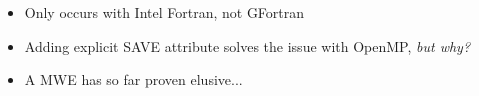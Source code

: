 \documentclass{beamer}
\begin{document}
\begin{frame}
{\begin{itemize}
      \item Only occurs with Intel Fortran, not GFortran
      \item Adding explicit SAVE attribute solves the issue with OpenMP, \emph{but why?}
      \item A MWE has so far proven elusive...
    \end{itemize}
    }
\end{frame}
\end{document}
